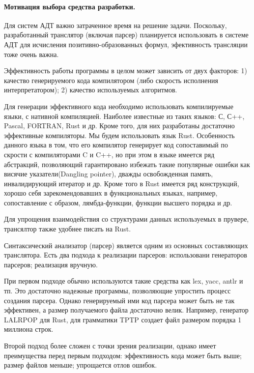 \documentclass[a4paper]{jctart15b}
\begin{document}
\paragraph{Мотивация выбора средства разработки.} 
Для систем АДТ важно затраченное время на решение задачи. Поскольку, разработанный транслятор (включая парсер) планируется использовать в системе АДТ для исчисления позитивно-образованных формул, эфективность трансляции тоже очень важна.

Эффективность работы программы в целом может зависить от двух факторов: 1) качество генерируемого кода компилятором (либо скорость исполнения интерпретатором); 2) качество используемых алгоритмов.

Для генерации эффективного кода необходимо использовать компилируемые языки, с нативной компиляцией. Наиболее известные из таких языков: С, С++, Pascal, FORTRAN, Rust и др. Кроме того, для них разработаны достаточно эффективные компиляторы. Мы будем использовать язык Rust. Особенность данного языка в том, что его компилятор генерирует код сопоставимый по скрости с компиляторами C и C++, но при этом в языке имеется ряд абстракций, позволяющий гарантировано избежать такие популярные ошибки как висячие указатели(Dangling pointer), дважды освобожденная память, инвалидирующий итератор и др. Кроме того в Rust имеется ряд конструкций, хорошо себя зарекомендовавших в функциональных языках, например, сопоставление с образом, лямбда-функции, функции высшего порядка и др.

Для упрощения взаимодействия со структурами данных используемых в прувере, трансялтор также удобнее писать на Rust.

Синтаксический анализатор (парсер) является одним из основных составляющих транслятора. Есть два подхода к реализации парсеров: использовани генераторов парсеров; реализация вручную.

При первом подходе обычно используются такие средства как lex, yacc, antlr и тп. Это достаточно надежные программы, позволяющие упростить процесс создания парсера. Однако генерируемый ими код парсера может быть не так эффективен, а размер получаемого файла достаточно велик. Например, генератор LALRPOP для Rust, для грамматики TPTP создает файл размером порядка 1 миллиона строк.

Второй подход более сложен с точки зрения реализации, однако имеет преимущества перед первым подходом: эффективность кода может быть выше; размер файлов меньше; упрощается отлов ошибок.
\end{document}

